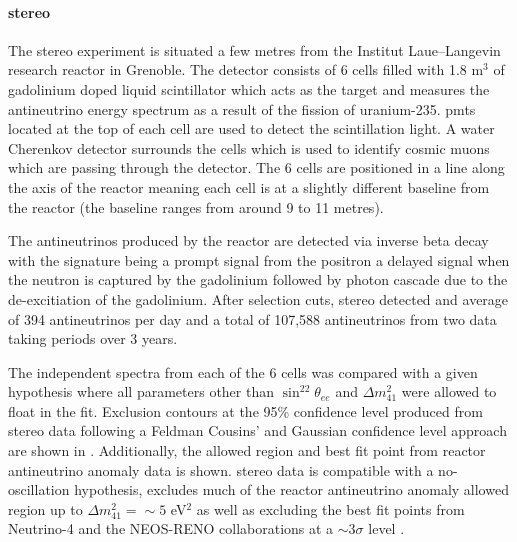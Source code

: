 \paragraph{\gls{stereo}}
The \gls{stereo} experiment is situated a few metres from the Institut Laue–Langevin research reactor in Grenoble. The detector consists of 6 cells filled with 1.8 m$^3$ of gadolinium doped liquid scintillator which acts as the target and measures the antineutrino energy spectrum as a result of the fission of uranium-235. \glspl{pmt} located at the top of each cell are used to detect the scintillation light. A water Cherenkov detector surrounds the cells which is used to identify cosmic muons which are passing through the detector. The 6 cells are positioned in a line along the axis of the reactor meaning each cell is at a slightly different baseline from the reactor (the baseline ranges from around 9 to 11 metres). 

The antineutrinos produced by the reactor are detected via inverse beta decay with the signature being a prompt signal from the positron a delayed signal when the neutron is captured by the gadolinium followed by photon cascade due to the de-excitiation of the gadolinium. After selection cuts, \gls{stereo} detected and average of 394 antineutrinos per day and a total of 107,588 antineutrinos from two data taking periods over 3 years.  

The independent spectra from each of the 6 cells was compared with a given hypothesis where all parameters other than $\sin^22\theta_{ee}$ and $\Delta m^2_{41}$ were allowed to float in the fit. Exclusion contours at the 95\% confidence level produced from \gls{stereo} data following a Feldman Cousins' and Gaussian confidence level approach are shown in . Additionally, the allowed region and best fit point from reactor antineutrino anomaly data is shown. \gls{stereo} data is compatible with a no-oscillation hypothesis, excludes much of the reactor antineutrino anomaly allowed region up to $\Delta m^2_{41} = \sim 5$ eV$^2$ as well as excluding the best fit points from Neutrino-4 and the NEOS-RENO collaborations at a $\sim 3\sigma$ level \cite{STEREO}. 

